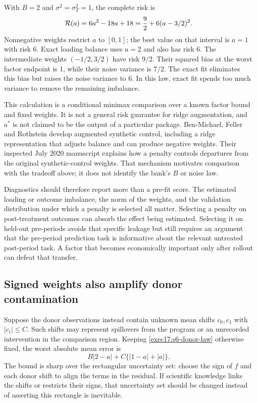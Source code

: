 With $B=2$ and $\sigma^2=\sigma_T^2=1$, the complete risk is
\begin{equation}
 {\cal R}(a)=6a^2-18a+18
            =\frac92+6(a-3/2)^2.
 \label{exec17:s6-donor-square}
\end{equation}
Nonnegative weights restrict $a$ to $[0,1]$; the best value on that
interval is $a=1$ with risk 6. Exact loading balance uses $a=2$
and also has risk 6. The intermediate weights $(-1/2,3/2)$ have
risk $9/2$. Their squared bias at the worst factor endpoint is 1,
while their noise variance is $7/2$. The exact fit eliminates this bias
but raises the noise variance to 6. In this law, exact fit spends too much
variance to remove the remaining imbalance.

This calculation is a conditional minimax comparison over a known factor
bound and fixed weights. It is not a general risk guarantee for ridge
augmentation, and $a^*$ is not claimed to be the output of a particular
package. Ben-Michael, Feller and Rothstein develop augmented synthetic control,
including a ridge representation that adjusts balance and can produce
negative weights. Their inspected July 2020 manuscript explains how a penalty
controls departures from the original synthetic-control weights. That
mechanism motivates comparison with the tradeoff above; it does not identify
the bank's $B$ or noise law.\citep{benmichael2021}

Diagnostics should therefore report more than a pre-fit score. The
estimated loading or outcome imbalance, the norm of the weights, and the
validation distribution under which a penalty is selected all matter.
Selecting a penalty on post-treatment outcomes can absorb the effect
being estimated. Selecting it on held-out pre-periods avoids that specific
leakage but still requires an argument that the pre-period prediction task
is informative about the relevant untreated post-period task. A factor that
becomes economically important only after rollout can defeat that transfer.

\subsection{Signed weights also amplify donor contamination}

Suppose the donor observations instead contain unknown mean shifts $c_0,c_1$
with $|c_i|\leq C$. Such shifts may represent spillovers from the program
or an unrecorded intervention in the comparison region. Keeping
\eqref{exec17:s6-donor-law} otherwise fixed, the worst absolute mean error is
\begin{equation}
 B|2-a|+C\{|1-a|+|a|\}.
 \label{exec17:s6-contamination-radius}
\end{equation}
The bound is sharp over the rectangular uncertainty set: choose the sign of
$f$ and each donor shift to align the terms in the residual. If scientific
knowledge links the shifts or restricts their signs, that uncertainty set
should be changed instead of asserting this rectangle is inevitable.

